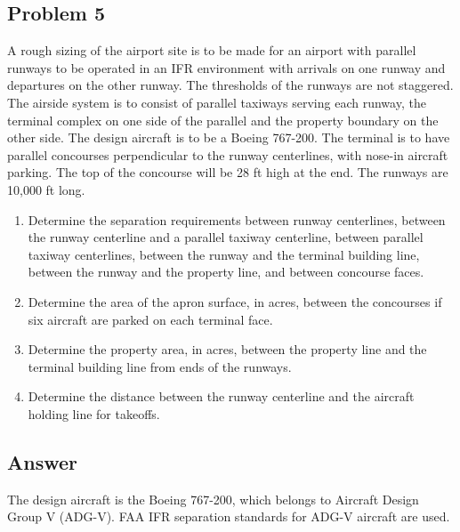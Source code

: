 \documentclass{KPS_assignment}
\begin{document}
\begin{enumerate}
\section*{Problem 5}

A rough sizing of the airport site is to be made for an airport with parallel runways to be operated in an IFR environment with arrivals on one runway and departures on the other runway. The thresholds of the runways are not staggered. The airside system is to consist of parallel taxiways serving each runway, the terminal complex on one side of the parallel and the property boundary on the other side. The design aircraft is to be a Boeing 767-200. The terminal is to have parallel concourses perpendicular to the runway centerlines, with nose-in aircraft parking. The top of the concourse will be 28 ft high at the end. The runways are 10,000 ft long.

\begin{enumerate}
    \item[(a)] Determine the separation requirements between runway centerlines, between the runway centerline and a parallel taxiway centerline, between parallel taxiway centerlines, between the runway and the terminal building line, between the runway and the property line, and between concourse faces.
    
    \item[(b)] Determine the area of the apron surface, in acres, between the concourses if six aircraft are parked on each terminal face.
    
    \item[(c)] Determine the property area, in acres, between the property line and the terminal building line from ends of the runways.
    
    \item[(d)] Determine the distance between the runway centerline and the aircraft holding line for takeoffs.
\end{enumerate}

\subsection{Answer}

The design aircraft is the Boeing 767-200, which belongs to Aircraft Design Group V (ADG-V). FAA IFR separation standards for ADG-V aircraft are used.


\end{enumerate}
\end{document}
